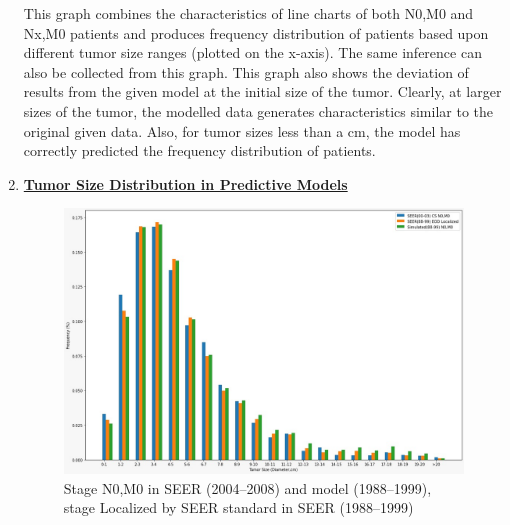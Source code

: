 \documentclass{article}
\begin{document}
\begin{enumerate}
This graph combines the characteristics of line charts of both N0,M0 and Nx,M0 patients and produces frequency distribution of patients based upon different tumor size ranges (plotted on the x-axis). The same inference can also be collected from this graph. This graph also shows the deviation of results from the given model at the initial size of the tumor. Clearly, at larger sizes of the tumor, the modelled data generates characteristics similar to the original given data. Also, for tumor sizes less than a cm, the model has correctly predicted the frequency distribution of patients.\\
	
	
	
\pagebreak	
	 
\item  \textbf{\underline{Tumor Size Distribution in Predictive Models}}

	\begin{figure}[htbp]
		\centerline{\includegraphics[scale=.2]{5.jpeg}}
		\caption{Stage N0,M0 in SEER (2004–2008) and model (1988–1999), stage Localized by SEER standard in SEER (1988–1999)
		}		
	\end{figure}	
	

\end{enumerate}
\end{document}
